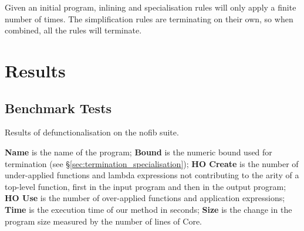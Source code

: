 \documentclass{sigplanconf}
\begin{document}
Given an initial program, inlining and specialisation rules will only apply a finite number of times. The simplification rules are terminating on their own, so when combined, all the rules will terminate.

\section{Results}
\label{sec:results}

\subsection{Benchmark Tests}

\begin{table}
\caption{Results of defunctionalisation on the nofib suite.}
\label{tab:results}

\smallskip

\textbf{Name} is the name of the program;
\textbf{Bound} is the numeric bound used for termination (see \S\ref{sec:termination_specialisation});
\textbf{HO Create} is the number of under-applied functions and lambda expressions not contributing to the arity of a top-level function, first in the input program and then in the output program;
\textbf{HO Use} is the number of over-applied functions and application expressions;
\textbf{Time} is the execution time of our method in seconds;
\textbf{Size} is the change in the program size measured by the number of lines of Core.

\smallskip\smallskip


\end{table}
\end{document}
